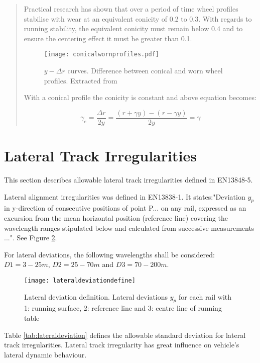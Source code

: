 \begin{appendices}
\begin{quote}
Practical research has shown that over a period of time wheel profiles stabilise with wear at an equivalent conicity of 0.2 to 0.3. With regards to running stability, the equivalent conicity must remain below 0.4 and to ensure the centering effect it must be greater than 0.1.

\begin{figure}[h]
    \centering
    \texttt{[image: conicalwornprofiles.pdf]}
    \caption{$y-\Delta r$ curves. Difference between conical and worn wheel profiles. Extracted from \citet[2.4]{esveld2001modern}}
    \label{fig:conicalwornprofiles}
\end{figure}

With a conical profile the conicity is constant and above equation becomes:

$$ \gamma_e = \frac{\Delta r}{2y} =\frac{(r+\gamma y)-(r-\gamma y)}{2y} = \gamma $$

\end{quote}

\section{Lateral Track Irregularities}\label{sec:lateraltrackirrgularities}

This section describes allowable lateral track irregularities defined in EN13848-5\citet{13848}. 

Lateral alignment irregularities was defined in EN13838-1. It states:"Deviation $y_p$ in y-direction of consecutive positions of point P... on any rail, expressed as an excursion from the mean horizontal position (reference line) covering the wavelength ranges stipulated below and calculated from successive measurements ...". See Figure \ref{fig:lateraldeviationdefine}.

For lateral deviations, the following wavelengths shall be considered: $D1 = 3 -25 m$, $D2 = 25 - 70 m$ and $D3 = 70 - 200 m$. 

\begin{figure}[h]
    \centering
    \texttt{[image: lateraldeviationdefine]}
    \caption{Lateral deviation definition. Lateral deviations $y_p$ for each rail with 1: running surface, 2: reference line and 3: centre line of running table}
    \label{fig:lateraldeviationdefine}
\end{figure}

Table \ref{tab:lateraldeviation} defines the allowable standard deviation for lateral track irregularities. Lateral track irregularity has great influence on vehicle's lateral dynamic behaviour.


\end{appendices}
